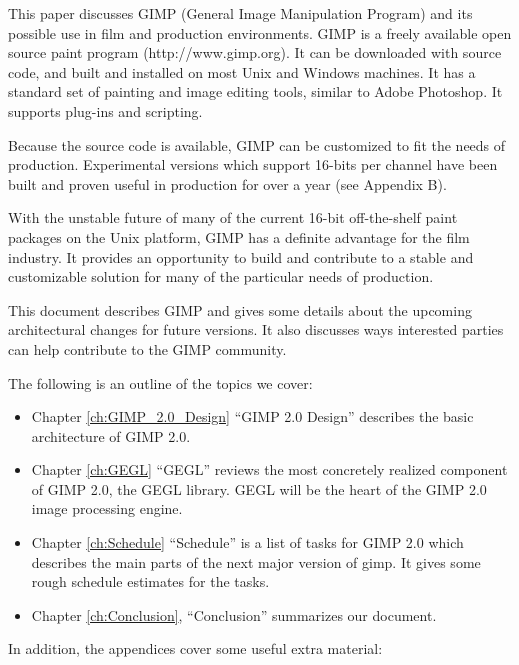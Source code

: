 This paper discusses GIMP (General Image Manipulation Program) and its possible
use in film and production environments. GIMP is a freely available open source
paint program (http://www.gimp.org). It can be downloaded with source code, and
built and installed on most Unix and Windows machines. It has a standard set of
painting and image editing tools, similar to Adobe Photoshop. It supports
plug-ins and scripting.

Because the source code is available, GIMP can be customized to fit the needs of
production. Experimental versions which support 16-bits per channel have been
built and proven useful in production for over a year (see Appendix B).

With the unstable future of many of the current 16-bit off-the-shelf paint
packages on the Unix platform, GIMP has a definite advantage for the film
industry. It provides an opportunity to build and contribute to a stable and
customizable solution for many of the particular needs of production. 

This document describes GIMP and gives some details about the upcoming
architectural changes for future versions. It also discusses ways interested
parties can help contribute to the GIMP community.  

The following is an outline of the topics we cover:

\begin{itemize}

\item Chapter \ref{ch:GIMP_2.0_Design} ``GIMP 2.0 Design'' describes 
the basic architecture of GIMP 2.0.

\item Chapter \ref{ch:GEGL} ``GEGL'' reviews the most concretely realized 
component of GIMP 2.0, the GEGL library. GEGL will be the heart of
the GIMP 2.0 image processing engine.

\item Chapter \ref{ch:Schedule} ``Schedule'' is a list of tasks for GIMP 2.0
which describes the main parts of the next major version of gimp. It gives some
rough schedule estimates for the tasks.  

\item Chapter \ref{ch:Conclusion}, ``Conclusion'' summarizes our document. 

\end{itemize}

In addition, the appendices cover some useful extra material:

